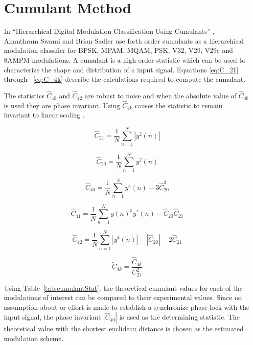 \chapter{Cumulant Method}

In ``Hierarchical Digital Modulation Classification Using Cumulants''
\cite{swami2000}, Ananthram Swami and Brian Sadler use forth order cumulants as
a hierarchical modulation classifier for BPSK, MPAM, MQAM, PSK, V32, V29, V29c
and 8AMPM modulations. A cumulant is a high order statistic which can be used to
characterize the shape and distribution of a input signal\cite{swami2000}.
Equations \ref{eq:C_21} through ~\ref{eq:C_4k} describe the calculations
required to compute the cumulant.  

The statistics $\hat{C}_{40}$ and $\hat{C}_{42}$ are robust to noise and when
the absolute value of $\hat{C}_{40}$ is used they are phase invariant.  Using
$\hat{C}_{4k}$ causes the statistic to remain invariant to linear scaling
\cite{swami2000}.

\begin{equation}
\hat{C}_{21} = \frac{1}{N} \sum_{n=1}^{N} |y^2(n)|
\label{eq:C_21}
\end{equation}

\begin{equation}
\hat{C}_{20} = \frac{1}{N} \sum_{n=1}^{N} y^2(n)
\label{eq:C_20} 
\end{equation}

\begin{equation}
\hat{C}_{40} = \frac{1}{N} \sum_{n=1}^{N} y^4(n) - 3 \hat{C}_{20}^2
\label{eq:C_40} 
\end{equation}

\begin{equation}
\hat{C}_{41} = \frac{1}{N} \sum_{n=1}^{N} y(n)^3 y^*(n) - \hat{C}_{20}\hat{C}_21
\label{eq:C_41}
\end{equation}

\begin{equation}
\hat{C}_{42} = \frac{1}{N} \sum_{n=1}^{N} |y^4(n)|-|\hat{C}_{20}|-2\hat{C}_{21}
\label{eq:C_42} 
\end{equation}

\begin{equation}
\tilde{C}_{4k} = \frac{\hat{C}_{4k}}{C_{21}^2}
\label{eq:C_4k}  
\end{equation}

Using Table~\ref{tab:cumulantStat}, the theoretical cumulant values for each of
the modulations of interest can be compared to their experimental values.  Since
no assumption about or effort is made to establish a synchronize phase lock with
the input signal, the phase invariant $|\hat{C}_{40}|$ is used as the determining
statistic.  The theoretical value with the shortest euclidean distance is chosen
as the estimated modulation scheme.


